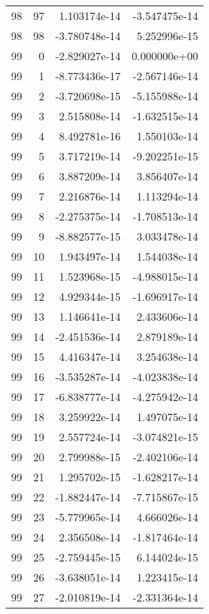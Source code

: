 \begin{tabular}{rrrr}
  98 &   97 &  1.103174e-14 & -3.547475e-14 \\
  98 &   98 & -3.780748e-14 &  5.252996e-15 \\
  99 &    0 & -2.829027e-14 &  0.000000e+00 \\
  99 &    1 & -8.773436e-17 & -2.567146e-14 \\
  99 &    2 & -3.720698e-15 & -5.155988e-14 \\
  99 &    3 &  2.515808e-14 & -1.632515e-14 \\
  99 &    4 &  8.492781e-16 &  1.550103e-14 \\
  99 &    5 &  3.717219e-14 & -9.202251e-15 \\
  99 &    6 &  3.887209e-14 &  3.856407e-14 \\
  99 &    7 &  2.216876e-14 &  1.113294e-14 \\
  99 &    8 & -2.275375e-14 & -1.708513e-14 \\
  99 &    9 & -8.882577e-15 &  3.033478e-14 \\
  99 &   10 &  1.943497e-14 &  1.544038e-14 \\
  99 &   11 &  1.523968e-15 & -4.988015e-14 \\
  99 &   12 &  4.929344e-15 & -1.696917e-14 \\
  99 &   13 &  1.146641e-14 &  2.433606e-14 \\
  99 &   14 & -2.451536e-14 &  2.879189e-14 \\
  99 &   15 &  4.416347e-14 &  3.254638e-14 \\
  99 &   16 & -3.535287e-14 & -4.023838e-14 \\
  99 &   17 & -6.838777e-14 & -4.275942e-14 \\
  99 &   18 &  3.259922e-14 &  1.497075e-14 \\
  99 &   19 &  2.557724e-14 & -3.074821e-15 \\
  99 &   20 &  2.799988e-15 & -2.402106e-14 \\
  99 &   21 &  1.295702e-15 & -1.628217e-14 \\
  99 &   22 & -1.882447e-14 & -7.715867e-15 \\
  99 &   23 & -5.779965e-14 &  4.666026e-14 \\
  99 &   24 &  2.356508e-14 & -1.817464e-14 \\
  99 &   25 & -2.759445e-15 &  6.144024e-15 \\
  99 &   26 & -3.638051e-14 &  1.223415e-14 \\
  99 &   27 & -2.010819e-14 & -2.331364e-14 \\

\end{tabular}
